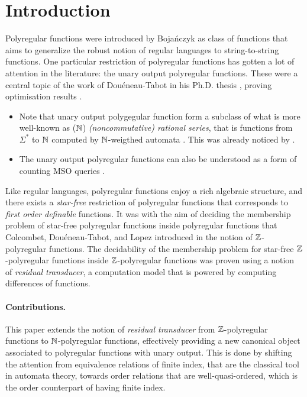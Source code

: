\documentclass[11pt]{article}
\begin{document}
\maketitle
\makeabstract


\section{Introduction}
\label{intro:sec}

Polyregular functions were introduced by Bojańczyk \cite{BOJA18} as class of
functions that aims to generalize the robust notion of regular languages to
string-to-string functions. One particular restriction of polyregular functions
has gotten a lot of attention in the literature: the unary output polyregular
functions. These were a central topic of the work of Douéneau-Tabot in his
Ph.D. thesis \cite{DOUE23}, proving optimisation results \cite{DOUE21}
\cite{DOUE22}. 

\begin{itemize}
    \item Note that unary output polygegular function form a subclass of
          what is more well-known as ($\mathbb{N}$) \emph{(noncommutative) rational series},
          that is functions from $\Sigma^*$ to $\mathbb{N}$ computed by $\mathbb{N}$-weigthed
          automata \cite{BERE88,BERE10}. This was already noticed by \cite{SCHU62}.
    \item The unary output polyregular functions can also be understood as 
          a form of counting MSO queries \cite{KRRC13}.
\end{itemize}

Like regular languages, polyregular functions enjoy a rich algebraic structure,
and there exists a \emph{star-free} restriction of polyregular functions that
corresponds to \emph{first order definable} functions. It was with the aim of
deciding the membership problem of star-free polyregular functions inside
polyregular functions that Colcombet, Douéneau-Tabot, and Lopez introduced in
\cite{CDTL23} the notion of $\mathbb{Z}$-polyregular functions. The decidability of
the membership problem for star-free $\mathbb{Z}$-polyregular functions inside
$\mathbb{Z}$-polyregular functions was proven using a notion of \emph{residual
transducer}, a computation model that is powered by computing differences of
functions. 


\paragraph{Contributions.} This paper extends the notion of \emph{residual
transducer} from $\mathbb{Z}$-polyregular functions to $\mathbb{N}$-polyregular functions,
effectively providing a new canonical object associated to polyregular
functions with unary output. This is done by shifting the attention from
equivalence relations of finite index, that are the classical tool in automata
theory, towards order relations that are well-quasi-ordered, which is the order
counterpart of having finite index. 
\end{document}
